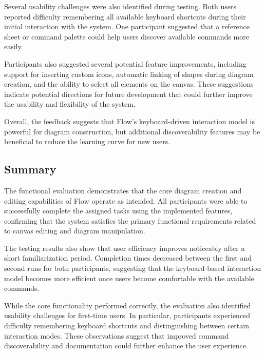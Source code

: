 \documentclass[12pt, titlepage]{article}
\begin{document}
Several usability challenges were also identified during testing. Both users
reported difficulty remembering all available keyboard shortcuts during
their initial interaction with the system. One participant suggested that a
reference sheet or command palette could help users discover available
commands more easily.

\vspace{1em}

Participants also suggested several potential feature improvements,
including support for inserting custom icons, automatic linking of shapes
during diagram creation, and the ability to select all elements on the
canvas. These suggestions indicate potential directions for future
development that could further improve the usability and flexibility of the
system.

\vspace{1em}

Overall, the feedback suggests that Flow's keyboard-driven interaction model
is powerful for diagram construction, but additional discoverability features
may be beneficial to reduce the learning curve for new users.

\subsection{Summary}

The functional evaluation demonstrates that the core diagram creation and
editing capabilities of Flow operate as intended. All participants were able
to successfully complete the assigned tasks using the implemented features,
confirming that the system satisfies the primary functional requirements
related to canvas editing and diagram manipulation.
\vspace{1em}

The testing results also show that user efficiency improves noticeably after
a short familiarization period. Completion times decreased between the first
and second runs for both participants, suggesting that the keyboard-based
interaction model becomes more efficient once users become comfortable with
the available commands.

\vspace{1em}

While the core functionality performed correctly, the evaluation also
identified usability challenges for first-time users. In particular,
participants experienced difficulty remembering keyboard shortcuts and
distinguishing between certain interaction modes. These observations suggest
that improved command discoverability and documentation could further
enhance the user experience.
\end{document}
